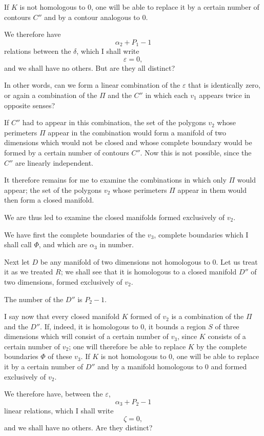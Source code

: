 \documentclass{article}
\begin{document}
If $K$ is not homologous to 0, one will be able to replace it by a certain number of contours $C''$ and by a contour analogous to 0.

We therefore have
\[ \alpha_{2} + P_{1} - 1 \]
relations between the $\delta$, which I shall write
\[ \varepsilon = 0, \]
and we shall have no others. But are they all distinct?

In other words, can we form a linear combination of the $\varepsilon$ that is identically zero, or again a combination of the $\Pi$ and the $C''$ in which each $v_{1}$ appears twice in opposite senses?

If $C''$ had to appear in this combination, the set of the polygons $v_{2}$ whose perimeters $\Pi$ appear in the combination would form a manifold of two dimensions which would not be closed and whose complete boundary would be formed by a certain number of contours $C''$. Now this is not possible, since the $C''$ are linearly independent.

It therefore remains for me to examine the combinations in which only $\Pi$ would appear; the set of the polygons $v_{2}$ whose perimeters $\Pi$ appear in them would then form a closed manifold.

We are thus led to examine the closed manifolds formed exclusively of $v_{2}$.

We have first the complete boundaries of the $v_{3}$, complete boundaries which I shall call $\Phi$, and which are $\alpha_{3}$ in number.

Next let $D$ be any manifold of two dimensions not homologous
to 0. Let us treat it as we treated $R$; we shall see that it is homologous to a closed manifold $D''$ of two dimensions, formed exclusively of $v_{2}$.

The number of the $D''$ is $P_{2} - 1$.

I say now that every closed manifold $K$ formed of $v_{2}$ is a combination of the $\Pi$ and the $D''$. If, indeed, it is homologous to 0, it bounds a region $S$ of three dimensions which will consist of a certain number of $v_{3}$, since $K$ consists of a certain number of $v_{2}$; one will therefore be able to replace $K$ by the complete boundaries $\Phi$ of these $v_{3}$. If $K$ is not homologous to 0, one will be able to replace it by a certain number of $D''$ and by a manifold homologous to 0 and formed exclusively of $v_{2}$.

We therefore have, between the $\varepsilon$,
\[ \alpha_{3} + P_{2} - 1 \]
linear relations, which I shall write
\[ \zeta = 0, \]
and we shall have no others. Are they distinct?
\end{document}
